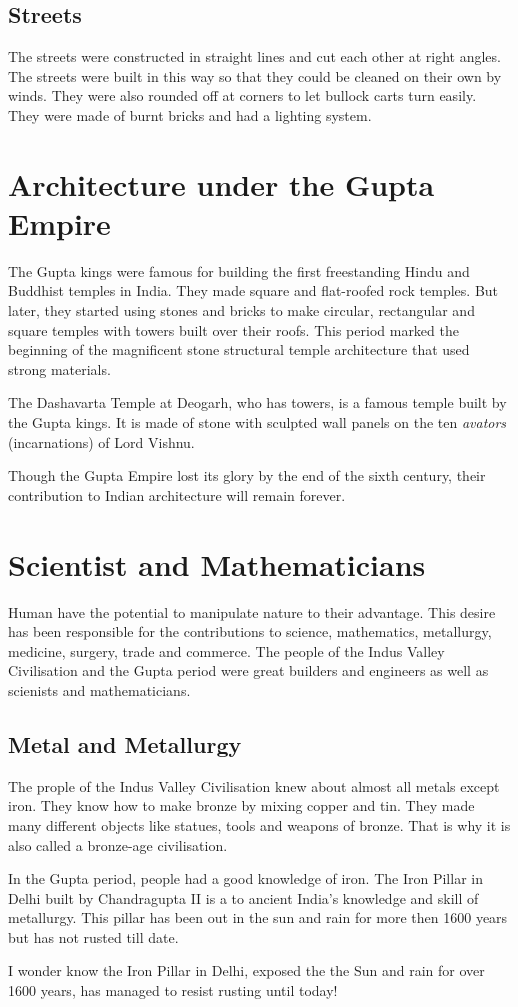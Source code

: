 \subsection{\textbf{Streets}}
The streets were constructed in straight lines and cut each other at right angles. The streets were built in this way so that they could be cleaned on their own by winds. They were also rounded off at corners to let bullock carts turn easily. They were made of burnt bricks and had a lighting system.
\section{Architecture under the Gupta Empire}
The Gupta kings were famous for building the first freestanding Hindu and Buddhist temples in India. They made square and flat-roofed rock temples. But later, they started using stones and bricks to make circular, rectangular and square temples with towers built over their roofs. This period marked the beginning of the magnificent stone structural temple architecture that used strong materials.
\vspace{0.1in}
\par
The Dashavarta Temple at Deogarh, who has towers, is a famous temple built by the Gupta kings. It is made of stone with sculpted wall panels on the ten \textit{avators} (incarnations) of Lord Vishnu.
\vspace{0.1in}
\par
Though the Gupta Empire lost its glory by the end of the sixth century, their contribution to Indian architecture will remain forever.
\vspace{1.2in}
\section{Scientist and Mathematicians}
Human have the potential to manipulate nature to their advantage. This desire has been responsible for the contributions to science, mathematics, metallurgy, medicine, surgery, trade and commerce. The people of the Indus Valley Civilisation and the Gupta period were great builders and engineers as well as scienists and mathematicians.
\subsection{Metal and Metallurgy}
The prople of the Indus Valley Civilisation knew about almost all metals except iron. They know how to make bronze by mixing copper and tin. They made many different objects like statues, tools and weapons of bronze. That is why it is also called a bronze-age civilisation.
\vspace{0.1in}
\par
In the Gupta period, people had a good knowledge of iron. The Iron Pillar in Delhi built by Chandragupta II is a to ancient India's knowledge and skill of metallurgy. This pillar has been out in the sun and rain for more then 1600 years but has not rusted till date.
\vspace{0.2in}
\par
I wonder know the Iron Pillar in Delhi, exposed the the Sun and rain for over 1600 years, has managed to resist rusting until today!
\vspace{0.2in}
